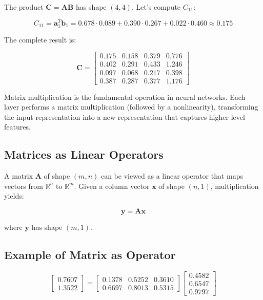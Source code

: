 \documentclass{book}
\begin{document}
The product $\mathbf{C} = \mathbf{AB}$ has shape $(4, 4)$. Let's compute $C_{11}$:

\begin{equation}
C_{11} = \mathbf{a}_1^T \mathbf{b}_1 = 0.678 \cdot 0.089 + 0.390 \cdot 0.267 + 0.022 \cdot 0.460 \approx 0.175
\end{equation}

The complete result is:

\begin{equation}
\mathbf{C} = \begin{bmatrix}
0.175 & 0.158 & 0.379 & 0.776 \\
0.402 & 0.291 & 0.433 & 1.246 \\
0.097 & 0.068 & 0.217 & 0.398 \\
0.387 & 0.287 & 0.377 & 1.176
\end{bmatrix}
\end{equation}

Matrix multiplication is the fundamental operation in neural networks. Each layer performs a matrix multiplication (followed by a nonlinearity), transforming the input representation into a new representation that captures higher-level features.

\subsection{Matrices as Linear Operators}

A matrix $\mathbf{A}$ of shape $(m, n)$ can be viewed as a linear operator that maps vectors from $\mathbb{R}^n$ to $\mathbb{R}^m$. Given a column vector $\mathbf{x}$ of shape $(n, 1)$, multiplication yields:

\begin{equation}
\mathbf{y} = \mathbf{A}\mathbf{x}
\end{equation}

where $\mathbf{y}$ has shape $(m, 1)$.

\subsection{Example of Matrix as Operator}

\begin{equation}
\begin{bmatrix}
0.7607 \\
1.3522
\end{bmatrix}
=
\begin{bmatrix}
0.1378 & 0.5252 & 0.3610 \\
0.6697 & 0.8013 & 0.5315
\end{bmatrix}
\begin{bmatrix}
0.4582 \\
0.6547 \\
0.9797
\end{bmatrix}
\end{equation}
\end{document}
